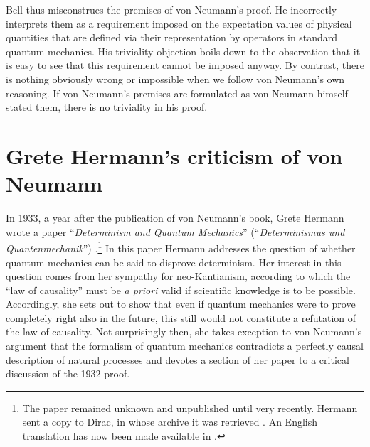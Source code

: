 \documentclass[12pt]{article}
\begin{document}
Bell thus misconstrues the premises of von Neumann's proof. He incorrectly interprets them as a requirement imposed on the expectation values of physical quantities that are defined via their representation by operators in standard quantum mechanics. His triviality objection boils down to the observation that it is easy to see that this requirement cannot be imposed anyway. By contrast, there is nothing obviously wrong or impossible when we follow von Neumann's own reasoning. If von Neumann's premises are formulated as von Neumann himself stated them, there is no triviality in his proof.



\section{Grete Hermann's criticism of von Neumann}\label{Hermann}

In 1933, a year after the publication of von Neumann's book, Grete Hermann wrote a paper ``\emph{Determinism and Quantum Mechanics}'' (``\emph{Determinismus und Quantenmechanik}'') \cite{hermann3}.\footnote{The paper remained unknown and unpublished until very recently. Hermann sent a copy to Dirac, in whose archive it was retrieved \cite[Ch.\@ 8]{crull}. An English translation has now been made available in \cite[Ch.\@ 14]{crull}.}
In this paper Hermann addresses the question of whether quantum mechanics can be said to disprove determinism. Her interest in this question comes from her sympathy for neo-Kantianism, according to which the ``law of causality'' must be \emph{a priori} valid if scientific knowledge is to be possible. Accordingly, she sets out to show that even if quantum mechanics were to prove completely right also in the future, this still would not constitute a refutation of the law of causality. Not surprisingly then, she takes exception to von Neumann's argument that the formalism of quantum mechanics contradicts a perfectly causal description of natural processes and devotes a section of her paper to a critical discussion of the 1932 proof.
\end{document}
